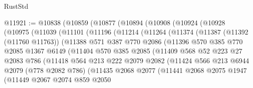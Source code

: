\begin{lexlean}{RustStd}
\begin{coremodule}
@11921 := @10838
    (@10859
      (@10877
        (@10894
          (@10908
            (@10924
              (@10928
                (@10975
                  (@11039
                    (@11101
                      (@11196
                        (@11214
                          (@11264
                            (@11374
                              (@11387
                                (@11392 (@11760 @11763))
                                (@11388
                                  @571
                                  @387
                                  @770
                                  @2086
                                  (@11396
                                    @570
                                    @385
                                    @770
                                    @2085
                                    @1367
                                    @6149
                                    (@11404
                                      @570
                                      @385
                                      @2085
                                      (@11409
                                        @568
                                        @52
                                        @223
                                        @27
                                        @2083
                                        @786
                                        (@11418
                                          @564
                                          @213
                                          @222
                                          @2079
                                          @2082
                                          (@11424
                                            @566
                                            @213
                                            @6944
                                            @2079
                                            (@778 @2082 @786)
                                            (@11435
                                              @2068
                                              @2077
                                              (@11441
                                                @2068
                                                @2075
                                                @1947
                                                (@11449
                                                  @2067
                                                  @2074
                                                  @859
                                                  @2050

\end{coremodule}
\end{lexlean}
